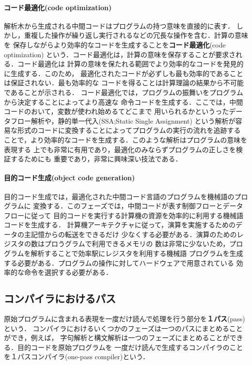 \documentclass[a4j,dvipdfmx]{jbook}
\begin{document}
\paragraph{{\bf コード最適化}(code optimization)}
解析木から生成される中間コードはプログラムの持つ意味を直接的に表す．
しかし，重複した操作が繰り返し実行されるなどの冗長な操作を含む．計算の意味を
保存しながらより効率的なコードを生成することを{\bf コード最適化}(code optimization)
という．コード最適化は，計算の意味を保存することが要求される．コード最適化は
計算の意味を保たれる範囲でより効率的なコードを発見的に生成する．このため，
最適化されたコードが必ずしも最も効率的であることは保証されない．最も効率的な
コードを得ることは計算理論の結果から不可能であることが示される．
コード最適化では，プログラムの振舞いをプログラムから決定することによってより高速な
命令コードを生成する．ここでは，中間コードのおいて，変数が使われ始めるてどこまで
用いられるかというったデータフロー解析や，静的単一代入(SSA;Static Single Assignment)
という解析が容易な形式のコードに変換することによってプログラムの実行の流れを追跡する
ことで，より効率的なコードを生成する．このような解析はプログラムの意味を表現する
上でも非常に有用であり，最適化のみならずプログラムの正しさを検証するためにも
重要であり，非常に興味深い技法である．

\paragraph{{\bf 目的コード生成}(object code generation)}
目的コード生成では，最適化された中間コード言語のプログラムを機械語のプログラムに
変換する．このフェーズでは，中間コードが表す制御フローとデータフローに従って
目的コードを実行する計算機の資源を効率的に利用する機械語コードを生成する．
計算機アーキテクチャに従って，演算を実施するためのデータの主記憶からの転送をできるだけ
少なくする必要がある．演算のためのレジスタの数はプロうグラムで利用できるメモリの
数は非常に少ないため，プログラムを解析することで効率駅にレジスタを利用する機械語
プログラムを生成する必要がある．プログラムの操作に対してハードウェアで用意されている
効率的な命令を選択する必要がある．

\subsection{コンパイラにおけるパス}
原始プログラムに含まれる表現を一度だけ読んで処理を行う部分を{\bf １パス}(pass)という．
コンパイラにおけるいくつかのフェーズは一つのパスにまとめることができ，例えば，
字句解析と構文解析は一つのフェーズにまとめることができる．目的コードを原始プログラムを
一度だけ読んで生成するコンパイラのことを１パスコンパイラ(one-pass compiler)という．
\end{document}
